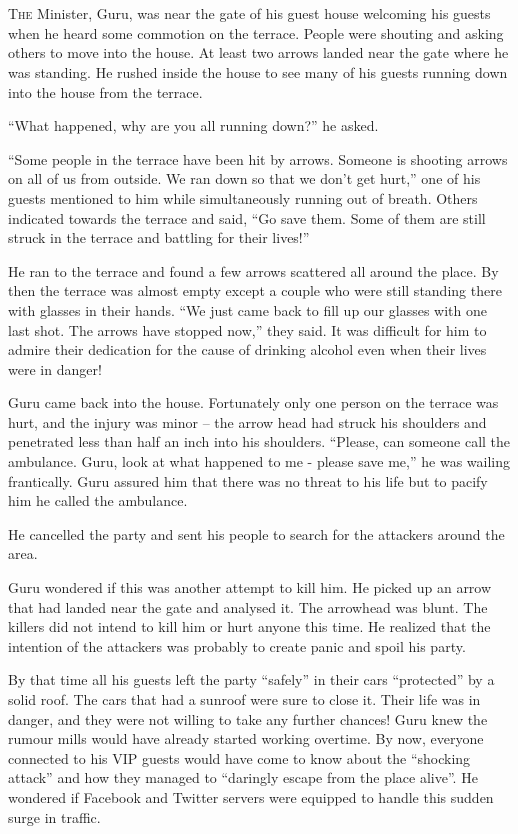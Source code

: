 \chapter{}

\lettrine{T}{he} Minister, Guru, was near the gate of his guest house welcoming his guests
when he heard some commotion on the terrace. People were shouting and asking
others to move into the house. At least two arrows landed near the gate where he
was standing. He rushed inside the house to see many of his guests running down
into the house from the terrace.

“What happened, why are you all running down?” he asked.

“Some people in the terrace have been hit by arrows. Someone is shooting arrows
on all of us from outside. We ran down so that we don't get hurt,” one of his
guests mentioned to him while simultaneously running out of breath. Others
indicated towards the terrace and said, “Go save them. Some of them are still
struck in the terrace and battling for their lives!”

He ran to the terrace and found a few arrows scattered all around the place. By
then the terrace was almost empty except a couple who were still standing there
with glasses in their hands. “We just came back to fill up our glasses with one
last shot. The arrows have stopped now,” they said. It was difficult for him to
admire their dedication for the cause of drinking alcohol even when their lives
were in danger!

Guru came back into the house. Fortunately only one person on the terrace was
hurt, and the injury was minor – the arrow head had struck his shoulders and
penetrated less than half an inch into his shoulders. “Please, can someone call the
ambulance. Guru, look at what happened to me - please save me,” he was wailing
frantically. Guru assured him that there was no threat to his life but to pacify
him he called the ambulance.

He cancelled the party and sent his people to search for the attackers around the
area.

Guru wondered if this was another attempt to kill him. He picked up an arrow
that had landed near the gate and analysed it. The arrowhead was blunt. The
killers did not intend to kill him or hurt anyone this time. He realized that
the intention of the attackers was probably to create panic and spoil his party.

By that time all his guests left the party “safely” in their cars “protected” by
a solid roof. The cars that had a sunroof were sure to close it. Their life was
in danger, and they were not willing to take any further chances! Guru knew the
rumour mills would have already started working overtime. By now, everyone
connected to his VIP guests would have come to know about the “shocking attack”
and how they managed to “daringly escape from the place alive”. He wondered if
Facebook and Twitter servers were equipped to handle this sudden surge in
traffic.

